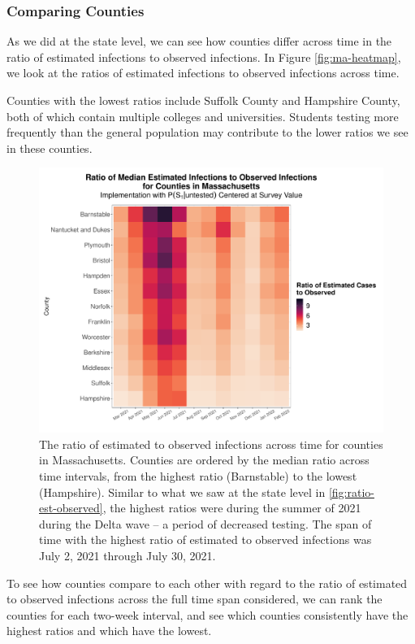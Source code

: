 \documentclass[12pt,twoside]{smiththesis}
\begin{document}
\hypertarget{comparing-counties}{%
\subsubsection{Comparing Counties}\label{comparing-counties}}

As we did at the state level, we can see how counties differ across time in the ratio of estimated infections to observed infections. In Figure \ref{fig:ma-heatmap}, we look at the ratios of estimated infections to observed infections across time.

Counties with the lowest ratios include Suffolk County and Hampshire County, both of which contain multiple colleges and universities. Students testing more frequently than the general population may contribute to the lower ratios we see in these counties.
\begin{figure}
\includegraphics[width=1\linewidth]{figure/ma_county_heatmap_ratio_est_observed} \caption{\label{fig:ma-heatmap} The ratio of estimated to observed infections across time for counties in Massachusetts. Counties are ordered by the median ratio across time intervals, from the highest ratio (Barnstable) to the lowest (Hampshire). Similar to what we saw at the state level in \ref{fig:ratio-est-observed}, the highest ratios were during the summer of 2021 during the Delta wave -- a period of decreased testing. The span of time with the highest ratio of estimated to observed infections was July 2, 2021 through July 30, 2021.}\label{fig:unnamed-chunk-23}
\end{figure}
To see how counties compare to each other with regard to the ratio of estimated to observed infections across the full time span considered, we can rank the counties for each two-week interval, and see which counties consistently have the highest ratios and which have the lowest.
\end{document}
